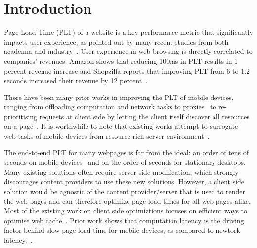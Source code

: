 \section{Introduction}
\label{sec:intro}

Page Load Time (PLT) of a website is a key performance metric that
significantly impacts user-experience, as pointed out by many recent studies
from both academia and industry~\cite{bhatti2000integrating, bouch2000quality}.
User-experience in web browsing is directly correlated to companies' revenues:
Amazon shows that reducing 100ms in PLT results in 1 percent revenue increase
and Shopzilla reports that improving PLT from 6 to 1.2 seconds increased their
revenue by 12 percent~\cite{url3}. 

There have been many prior works in improving the PLT of mobile devices,
ranging from offloading computation and network tasks to
proxies~\cite{netravali2015mahimahi, sivakumar2014parcel, wang2014speedy} to
re-prioritising requests at client side by letting the client itself discover
all resources on a page~\cite{butkiewicz2015klotski, netravali2016polaris}.  It
is worthwhile to note that existing works attempt to surrogate web-tasks of
mobile devices from resource-rich server
environment~\cite{ruamviboonsuk2017vroom}.
 
The end-to-end PLT for many webpages is far from the ideal: an order
of tens of seconds on mobile devices~\cite{wang2013demystifying} and
on the order of seconds for stationary desktops.  Many existing solutions
often require server-side modification, which strongly discourages
content providers to use these new solutions. 
However, a client side solution would be agnostic of the content
provider/server that is used to render the web pages and
can therefore optimize page load times for all web pages alike. 
Most of the existing work on client side optimiztions focuses on efficient ways to
optimise web cache~\cite{wang2014much}.  
Prior work shows that computation latency is the driving factor behind slow page load time for mobile devices, as compared to newtork latency.~\cite{vesuna2016caching}.

